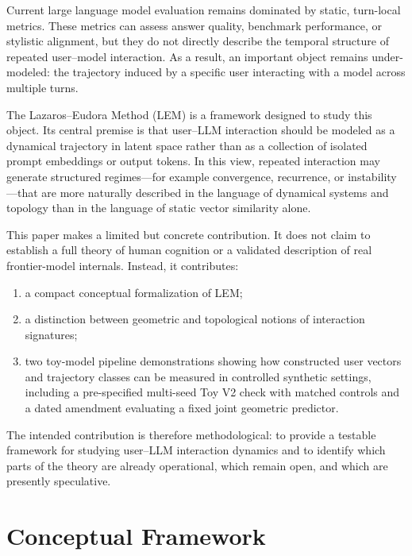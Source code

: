 \documentclass[11pt]{article}
\begin{document}
Current large language model evaluation remains dominated by static, turn-local
metrics. These metrics can assess answer quality, benchmark performance, or
stylistic alignment, but they do not directly describe the temporal structure of
repeated user--model interaction. As a result, an important object remains
under-modeled: the trajectory induced by a specific user interacting with a model
across multiple turns.

The Lazaros--Eudora Method (LEM) is a framework designed to study this object. Its
central premise is that user--LLM interaction should be modeled as a dynamical
trajectory in latent space rather than as a collection of isolated prompt
embeddings or output tokens. In this view, repeated interaction may generate
structured regimes---for example convergence, recurrence, or instability---that
are more naturally described in the language of dynamical systems and topology
than in the language of static vector similarity alone.

This paper makes a limited but concrete contribution. It does not claim to
establish a full theory of human cognition or a validated description of real
frontier-model internals. Instead, it contributes:

\begin{enumerate}[leftmargin=1.8em]
  \item a compact conceptual formalization of LEM;
  \item a distinction between geometric and topological notions of interaction
        signatures;
  \item two toy-model pipeline demonstrations showing how constructed user
        vectors and trajectory classes can be measured in controlled synthetic
        settings, including a pre-specified multi-seed Toy V2 check with matched
        controls and a dated amendment evaluating a fixed joint geometric predictor.
\end{enumerate}

The intended contribution is therefore methodological: to provide a testable
framework for studying user--LLM interaction dynamics and to identify which parts
of the theory are already operational, which remain open, and which are presently
speculative.


\section{Conceptual Framework}
\end{document}
